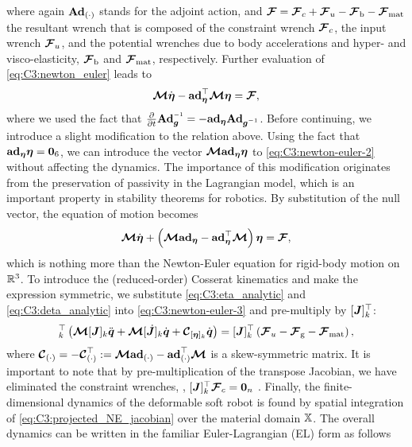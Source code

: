 %
where again $\textbf{Ad}_{(\cdot)}$ stands for the adjoint action, and $\boldsymbol{\mathcal{F}} = \boldsymbol{\mathcal{F}}_c  + \boldsymbol{\mathcal{F}}_u - \boldsymbol{\mathcal{F}}_\textrm{b} - \boldsymbol{\mathcal{F}}_{\textrm{mat}}$ the resultant wrench that is composed of the constraint wrench $\boldsymbol{\mathcal{F}}_c$, the input wrench $\boldsymbol{\mathcal{F}}_u$, and the potential wrenches due to body accelerations and hyper- and visco-elasticity, $\boldsymbol{\mathcal{F}}_\textrm{b}$ and $ \boldsymbol{\mathcal{F}}_{\textrm{mat}}$, respectively. Further evaluation of \eqref{eq:C3:newton_euler} leads to
%
\begin{equation}
{\boldsymbol{\mathcal{M}}}\dot{\boldsymbol{\eta}} - \textbf{ad}_{\boldsymbol{\eta}}^\top {\boldsymbol{\mathcal{M}}} \boldsymbol{\eta} = \boldsymbol{\mathcal{F}},
\label{eq:C3:newton-euler-2}
\end{equation}
%
where we used the fact that $\tfrac{\p}{\p t}{\Ad}_{\vec{g}} \inv = -\ad_{\vec{\eta}} {\Ad}_{\vec{g} \inv}$. Before continuing, we introduce a slight modification to the relation above. Using the fact that $\textbf{ad}_{\boldsymbol{\eta}} \boldsymbol{\eta} = \boldsymbol{0}_6$, we can introduce the vector
$\boldsymbol{\mathcal{M}} \textbf{ad}_{\boldsymbol{\eta}} \boldsymbol{\eta}$ to \eqref{eq:C3:newton-euler-2} without affecting the dynamics. The importance of this modification originates from the preservation of passivity in the Lagrangian model, which is an important property in stability theorems for robotics. By substitution of the null vector, the equation of motion becomes
%
\begin{equation}
  {\boldsymbol{\mathcal{M}}} \dot{\boldsymbol{\eta}} + \left({\boldsymbol{\mathcal{M}}} \textbf{ad}_{\boldsymbol{\eta}}  - \textbf{ad}_{\boldsymbol{\eta}} ^\top {\boldsymbol{\mathcal{M}}} \right) \boldsymbol{\eta} = {\boldsymbol{\mathcal{F}}},
  \label{eq:C3:newton-euler-3}
\end{equation}
%
which is nothing more than the Newton-Euler equation for rigid-body motion on $\mathbb{R}^3$. To introduce the (reduced-order) Cosserat kinematics and make the expression symmetric, we substitute \eqref{eq:C3:eta_analytic} and \eqref{eq:C3:deta_analytic} into \eqref{eq:C3:newton-euler-3} and pre-multiply by $[{\boldsymbol{J}}]_k^\top$:
%
\begin{align}
  [\vec{J}]_k^\top \left( \MT [\mat{J}]_k \ddot{\vec{q}} + \MT [\dJB]_k\dot{\vec{q}} + \CT_{[\vec{\eta}]_k }\dot{\vec{q}}\right) = [\mat{J}]_k^\top \left(\FT_u - \FT\grav -  \ten{F}_{\textrm{mat}} \right),
  \label{eq:C3:projected_NE_jacobian}
\end{align}
%
where ${\boldsymbol{\mathcal{C}}}_{(\cdot)} = -{\boldsymbol{\mathcal{C}}}_{(\cdot)} ^\top :=  {\boldsymbol{\mathcal{M}}} \textbf{ad}_{(\cdot)}  - \textbf{ad}_{(\cdot)} ^\top {\boldsymbol{\mathcal{M}}}$ is a skew-symmetric matrix. It is important to note that by pre-multiplication of the transpose Jacobian, we have eliminated the constraint wrenches, \ie, $[{\boldsymbol{J}}]_k^\top {\boldsymbol{\mathcal{F}}}_c = \boldsymbol{0}_n$ \cite{Murray1994}. Finally, the finite-dimensional dynamics of the deformable soft robot is found by spatial integration of \eqref{eq:C3:projected_NE_jacobian} over the material domain $\mathbb{X}$. The overall dynamics can be written in the familiar Euler-Lagrangian (EL) form as follows

